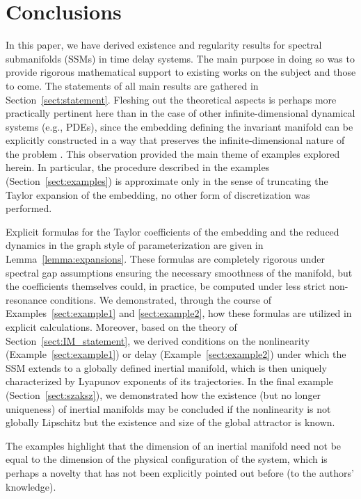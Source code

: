 \documentclass[a4paper, 12pt, oneside, reqno, notitlepage]{amsart}
\theoremstyle{plain}
\theoremstyle{definition}
\theoremstyle{remark}
\begin{document}
\section{Conclusions}


In this paper, we have derived existence and regularity results for spectral submanifolds (SSMs) in time delay systems.
The main purpose in doing so was to provide rigorous
mathematical support to existing works on the subject \cite{szaksz2024reduction,szaksz2025spectral} and those to come.
The statements of all main results are gathered in Section~\ref{sect:statement}.
Fleshing out the theoretical aspects 
is perhaps more practically pertinent
here than in the case of other infinite-dimensional dynamical systems (e.g., PDEs), since the embedding defining the invariant manifold can be explicitly constructed in a way that preserves the infinite-dimensional nature of the problem \cite{szaksz2025spectral}.
This observation 
provided the main theme of examples explored herein. 
In particular, the procedure described in the examples (Section~\ref{sect:examples}) is approximate only in the sense of truncating the Taylor expansion of the embedding, 
no other form of discretization was performed.
 

Explicit formulas for the Taylor coefficients of the embedding and the reduced dynamics in the graph style of parameterization are given in Lemma~\ref{lemma:expansions}.
These formulas are completely rigorous under spectral gap assumptions ensuring the necessary smoothness of the manifold, but the coefficients themselves could, in practice, be computed under less strict non-resonance conditions. 
We demonstrated, through the course of Examples~\ref{sect:example1} and \ref{sect:example2}, how these formulas 
are  utilized in
explicit calculations.
Moreover, based on the theory of Section~\ref{sect:IM_statement}, we derived conditions on the nonlinearity (Example~\ref{sect:example1}) or delay (Example~\ref{sect:example2}) under which the SSM extends to a globally defined inertial manifold, which is then uniquely characterized by Lyapunov exponents of its trajectories.
In the final example (Section~\ref{sect:szaksz}), we demonstrated how the existence (but no longer uniqueness) of inertial manifolds may be concluded if the nonlinearity is not globally Lipschitz but the existence and size of the global attractor is known.



The examples highlight 
that the dimension of an inertial manifold need not be equal to the dimension of the physical configuration of the system, which is perhaps a novelty that has not been explicitly pointed out before (to the authors' knowledge).
\end{document}
